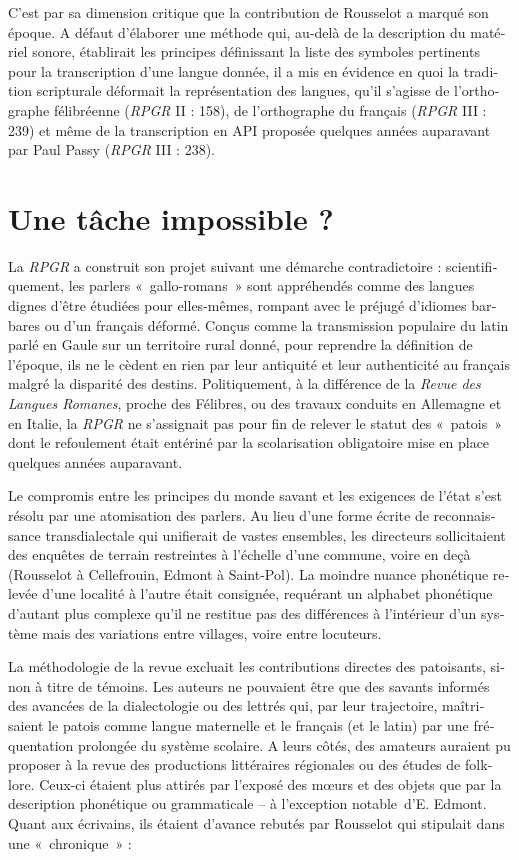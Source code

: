 \documentclass[output=paper]{../langscibook}
\begin{document}
\begin{otherlanguage}{french}
C’est par sa dimension critique que la contribution de Rousselot a marqué son époque. A défaut d’élaborer une méthode qui, au-delà de la description du matériel sonore, établirait les principes définissant la liste des symboles pertinents pour la transcription d’une langue donnée, il a mis en évidence en quoi la tradition scripturale déformait la représentation des langues, qu’il s’agisse de l’orthographe félibréenne (\textit{RPGR} II : 158), de l’orthographe du français (\textit{RPGR} III : 239) et même de la transcription en API proposée quelques années auparavant par Paul Passy (\textit{RPGR} III : 238).

\section{Une tâche impossible ?}

La \textit{RPGR} a construit son projet suivant une démarche contradictoire : scientifiquement, les parlers «~gallo-romans~» sont appréhendés comme des langues dignes d’être étudiées pour elles-mêmes, rompant avec le préjugé d’idiomes barbares ou d’un français déformé. Conçus comme la transmission populaire du latin parlé en Gaule sur un territoire rural donné, pour reprendre la définition de l’époque, ils ne le cèdent en rien par leur antiquité et leur authenticité au français malgré la disparité des destins. Politiquement, à la différence de la \textit{Revue des Langues Romanes}, proche des Félibres, ou des travaux conduits en Allemagne et en Italie, la \textit{RPGR} ne s’assignait pas pour fin de relever le statut des «~patois~» dont le refoulement était entériné par la scolarisation obligatoire mise en place quelques années auparavant. 

Le compromis entre les principes du monde savant et les exigences de l’état s’est résolu par une atomisation des parlers. Au lieu d’une forme écrite de reconnaissance transdialectale qui unifierait de vastes ensembles, les directeurs sollicitaient des enquêtes de terrain restreintes à l’échelle d’une commune, voire en deçà (Rousselot à Cellefrouin, Edmont à Saint-Pol). La moindre nuance phonétique relevée d’une localité à l’autre était consignée, requérant un alphabet phonétique d’autant plus complexe qu’il ne restitue pas des différences à l’intérieur d’un système mais des variations entre villages, voire entre locuteurs.

La méthodologie de la revue excluait les contributions directes des patoisants, sinon à titre de témoins. Les auteurs ne pouvaient être que des savants informés des avancées de la dialectologie ou des lettrés qui, par leur trajectoire, maîtrisaient le patois comme langue maternelle et le français (et le latin) par une fréquentation prolongée du système scolaire. A leurs côtés, des amateurs auraient pu proposer à la revue des productions littéraires régionales ou des études de folklore. Ceux-ci étaient plus attirés par l’exposé des mœurs et des objets que par la description phonétique ou grammaticale – à l’exception notable~d’E. Edmont. Quant aux écrivains, ils étaient d’avance rebutés par Rousselot qui stipulait dans une «~chronique~» :


\end{otherlanguage}
\end{document}
